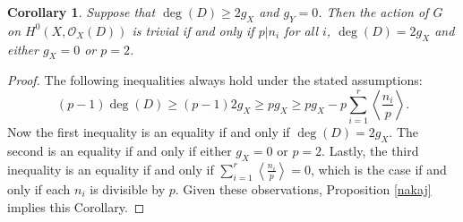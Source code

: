 \documentclass[11pt]{article} %
\newtheorem{cor}{Corollary}
\begin{document}
  \begin{cor}
    Suppose that $\deg(D)\geq 2g_X$ and $g_Y=0$. Then the action of $G$ on $H^0(X,\mathscr{O}_X(D))$ is trivial if and 
    only if $p | n_i$ for all $i$, $\deg(D)=2g_X$ and either $g_X=0$ or $p=2$.
  \end{cor}
  \begin{proof}
    The following inequalities always hold under the stated assumptions:
      \[
	(p-1)\deg(D)\geq (p-1)2g_X \geq pg_X \geq pg_X-p\sum_{i=1}^r\left\langle\frac{n_i}{p}\right\rangle.
      \]
    Now the first inequality is an equality if and only if $\deg(D)=2g_X$. 
    The second is an equality if and only if either $g_X=0$ or $p=2$. 
    Lastly, the third inequality is an equality if and only if $\sum_{i=1}^r\left\langle\frac{n_i}{p}\right\rangle=0$, which is the case if and only if each $n_i$ is divisible by $p$. 
    Given these observations, Proposition \ref{nakaj} implies this Corollary.
  \end{proof}
\end{document}

